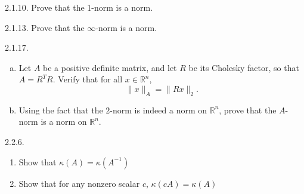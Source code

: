 \documentclass{report}
\begin{document}
    \bigbreak \noindent 
    \begin{mdframed}
        2.1.10. Prove that the 1-norm is a norm. 
    \end{mdframed}


    \bigbreak \noindent 
    \begin{mdframed}
        2.1.13.  Prove that the $\infty$-norm is a norm.
    \end{mdframed}

    \bigbreak \noindent 
    \begin{mdframed}
        2.1.17. \begin{enumerate}[(a)]
            \item Let $A$ be a positive definite matrix, and let $R$ be its Cholesky factor, 
                so that $A = R^{T}R$. Verify that for all $x \in \mathbb{R}^n$, 
                \[
                    \|x\|_{A} = \|Rx\|_{2}.
                \]

            \item Using the fact that the $2$-norm is indeed a norm on $\mathbb{R}^n$, 
                prove that the $A$-norm is a norm on $\mathbb{R}^n$.
        \end{enumerate}
    \end{mdframed}

    \bigbreak \noindent 
    \begin{mdframed}
        2.2.6.
        \begin{enumerate}[label=(\alph*)]
            \item Show that $\kappa(A) = \kappa(A^{-1})$
            \item Show that for any nonzero scalar $c$, $\kappa(cA) = \kappa(A)$
        \end{enumerate}
    \end{mdframed}
\end{document}
